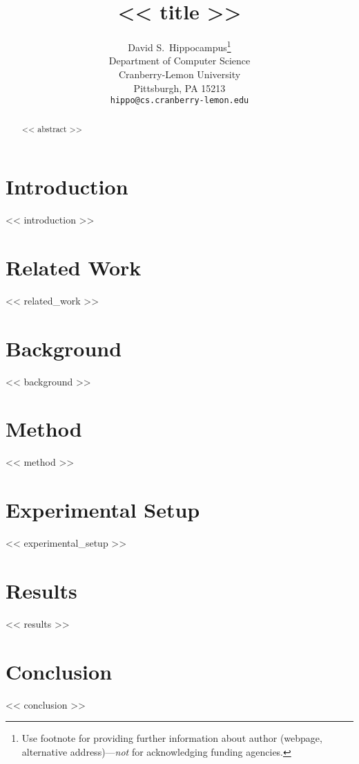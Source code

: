 \documentclass{article}
\title{<< title >>}
\author{%
  David S.~Hippocampus\thanks{Use footnote for providing further information
    about author (webpage, alternative address)---\emph{not} for acknowledging
    funding agencies.} \\
  Department of Computer Science\\
  Cranberry-Lemon University\\
  Pittsburgh, PA 15213 \\
  \texttt{hippo@cs.cranberry-lemon.edu} \\
}
\begin{document}
\maketitle


\begin{abstract}
<< abstract >>
\end{abstract}



\section{Introduction}
<< introduction >>

\section{Related Work}
<< related_work >>

\section{Background}
<< background >>

\section{Method}
<< method >>

\section{Experimental Setup}
<< experimental_setup >>

\section{Results}
<< results >>

\section{Conclusion}
<< conclusion >>




\end{document}
